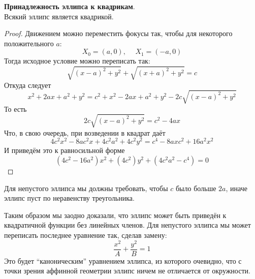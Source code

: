 \documentclass[11pt]{article}
\begin{document}
    \begin{lemma}
    \textbf{Принадлежность эллипса к квадрикам}.\\ Всякий эллипс является квадрикой.
    \end{lemma}

    \begin{proof}
    Движением можно переместить фокусы так, чтобы для некоторого положительного $a$:
    \begin{equation*}
        X_0 = (a, 0), \hspace{15pt} X_1 = (-a, 0)
    \end{equation*}
    Тогда исходное условие можно переписать так:
    \begin{equation*}
        \sqrt{(x - a)^2 + y^2} + \sqrt{(x + a)^2 + y^2} = c
    \end{equation*}
    Откуда следует
    \begin{equation*}
        x^2 + 2ax + a^2 + y^2 = c^2 + x^2 -2ax + a^2 + y^2 - 2c\sqrt{(x - a)^2 + y^2}
    \end{equation*}
    То есть
    \begin{equation*}
        2c\sqrt{(x - a)^2 + y^2} = c^2 - 4ax
    \end{equation*}
    Что, в свою очередь, при возведении в квадрат даёт
    \begin{equation*}
        4c^2x^2 - 8ac^2x + 4c^2a^2 + 4c^2y^2 = c^4 - 8axc^2 + 16a^2x^2
    \end{equation*}
    И приведём это к равносильной форме
    \begin{equation*}
        (4c^2 - 16a^2)x^2 + (4c^2)y^2 + (4c^2a^2 - c^4) = 0
    \end{equation*}
    \end{proof}

    \begin{remark}
    Для непустого эллипса мы должны требовать, чтобы $c$ было больше $2a$, иначе эллипс пуст по неравенству треугольника.
    \end{remark}

    \begin{remark}
    Таким образом мы заодно доказали, что эллипс может быть приведён к квадратичной функции без линейных членов. Для непустого эллипса мы может переписать последнее уравнение так, сделав замену:
    \begin{equation*}
        \dfrac{x^2}{A} + \dfrac{y^2}{B} = 1
    \end{equation*}
    Это будет ``каноническим'' уравнением эллипса, из которого очевидно, что с точки зрения аффинной геометрии эллипс ничем не отличается от окружности.
    \end{remark}
\end{document}
